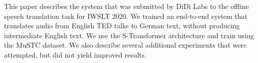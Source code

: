 This paper describes the system that was submitted by DiDi Labs to the offline speech translation task for IWSLT 2020. We trained an end-to-end system that translates audio from English TED talks to German text, without producing intermediate English text. We use the S-Transformer architecture and train using the MuSTC dataset. We also describe several additional experiments that were attempted, but did not yield improved results.
